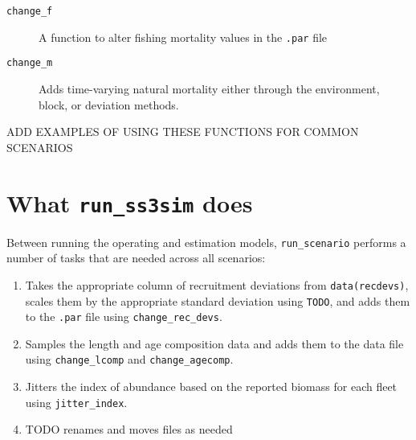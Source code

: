 \documentclass[12pt]{article}
\begin{document}
\begin{description}
  \item[\texttt{change\_f}] A function to alter fishing mortality values in the \texttt{.par} file

  \item[\texttt{change\_m}] Adds time-varying natural mortality either through the environment, block, or deviation methods.
\end{description}

ADD EXAMPLES OF USING THESE FUNCTIONS FOR COMMON SCENARIOS

\section*{What \texttt{run\_ss3sim} does}

Between running the operating and estimation models, \texttt{run\_scenario} performs a number of tasks that are needed across all scenarios:

\begin{enumerate}
  \item Takes the appropriate column of recruitment deviations from \texttt{data(recdevs)}, scales them by the appropriate standard deviation using \texttt{TODO}, and adds them to the \texttt{.par} file using \texttt{change\_rec\_devs}. \item Samples the length and age composition data and adds them to the data file using \texttt{change\_lcomp} and \texttt{change\_agecomp}.
  \item Jitters the index of abundance based on the reported biomass for each fleet using \texttt{jitter\_index}.
  \item TODO renames and moves files as needed
\end{enumerate}








%
\end{document}
